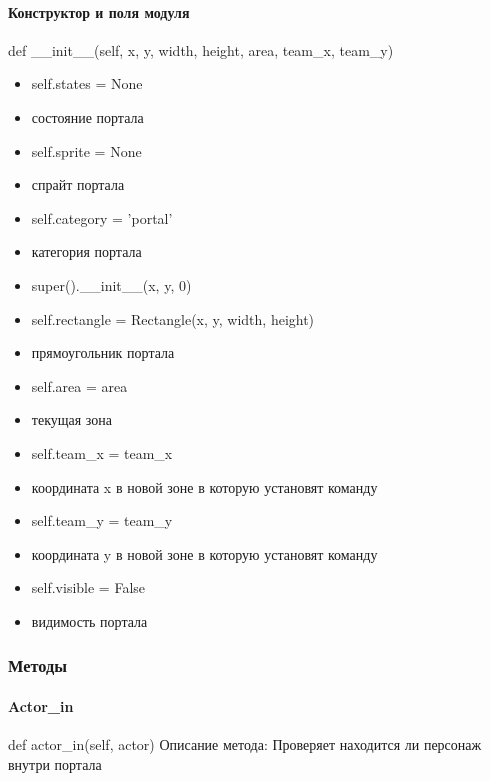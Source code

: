 \paragraph{Конструктор и поля модуля}
def \_\_init\_\_(self, x, y, width, height, area, team\_x, team\_y)
\begin{itemize}
	\item self.states = None
	\item состояние портала
	\item self.sprite = None
	\item спрайт портала
	\item self.category = 'portal'
	\item категория портала
	\item super().\_\_init\_\_(x, y, 0)
	\item self.rectangle = Rectangle(x, y, width, height)
	\item прямоугольник портала
	\item self.area = area
	\item текущая зона
	\item self.team\_x = team\_x
	\item координата x в новой зоне в которую установят команду
	\item self.team\_y = team\_y
	\item координата y в новой зоне в которую установят команду
	\item self.visible = False
	\item видимость портала
\end{itemize}
\subsubsection{Методы}
\paragraph{Actor\_in}
def actor\_in(self, actor)
Описание метода: Проверяет находится ли персонаж внутри портала

